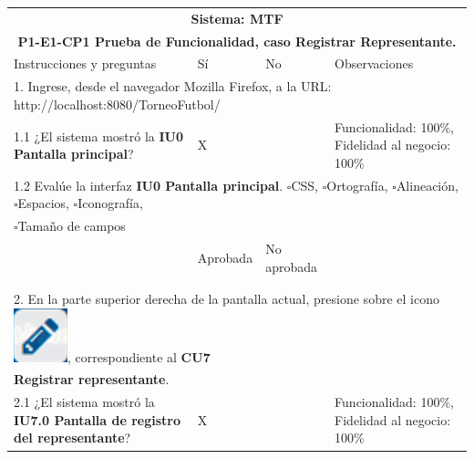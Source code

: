 \documentclass[oneside,10pt]{book}
\begin{document}
\begin{tabularx}{\textwidth}{ X l l X }
\multicolumn{4}{c}{\cellcolor[HTML]{9B9B9B}\textbf{Sistema: MTF}}                                                                                     \\
\multicolumn{4}{c}{\cellcolor[HTML]{EFEFEF}\textbf{P1-E1-CP1 Prueba de Funcionalidad, caso Registrar Representante.}}                                    \\ \hline
\multicolumn{1}{|X|}{Instrucciones y preguntas}                               & \multicolumn{1}{l|}{Sí} & \multicolumn{1}{l|}{No} & \multicolumn{1}{X|}{Observaciones} \\ \hline
\multicolumn{4}{|l|}{1. Ingrese, desde el navegador Mozilla Firefox, a la URL: http://localhost:8080/TorneoFutbol/}              \\ \hline
\multicolumn{1}{|X|}{1.1 ¿El sistema mostró la \textbf{IU0 Pantalla principal}?} & \multicolumn{1}{l|}{X}   & \multicolumn{1}{l|}{}   & \multicolumn{1}{X|}{Funcionalidad: 100\%, Fidelidad al negocio: 100\%}              \\ \hline
\multicolumn{4}{|l|}{1.2 Evalúe la interfaz \textbf{IU0 Pantalla principal}. $\square$CSS, $\square$Ortografía, $\square$Alineación, $\square$Espacios, $\square$Iconografía,}                        \\
\multicolumn{4}{|l|}{$\square$Tamaño de campos}                        \\ \hline
\multicolumn{1}{|l|}{ }	& \multicolumn{1}{l|}{Aprobada} & \multicolumn{1}{l|}{No aprobada} & \multicolumn{1}{l|}{ } \\ \hline
\multicolumn{1}{|l|}{ } & \multicolumn{1}{l|}{ } & \multicolumn{1}{l|}{ } & \multicolumn{1}{l|}{ } \\
\multicolumn{1}{|l|}{ } & \multicolumn{1}{l|}{ } & \multicolumn{1}{l|}{ } & \multicolumn{1}{l|}{ } \\ \hline
\multicolumn{4}{|l|}{2. En la parte superior derecha de la pantalla actual, presione sobre el icono \includegraphics[scale=.3]{images/signin}, correspondiente al \textbf{CU7}}              \\
\multicolumn{4}{|l|}{\textbf{Registrar representante}.}              \\ \hline
\multicolumn{1}{|X|}{2.1 ¿El sistema mostró la \textbf{IU7.0 Pantalla de registro del representante}?} & \multicolumn{1}{l|}{X}   & \multicolumn{1}{l|}{}   & \multicolumn{1}{X|}{Funcionalidad: 100\%, Fidelidad al negocio: 100\%}              \\ \hline

\end{tabularx}
\end{document}
